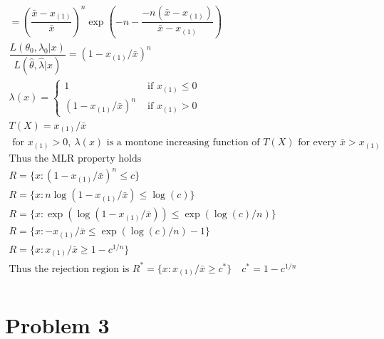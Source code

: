 \documentclass{article}
\newcommand{\lm}{\lambda}
\newcommand{\hth}{\hat{\theta}}
\newcommand{\ta}{\theta}
\newcommand{\lx}{\lambda(x)}
\newcommand{\xm}{x_{(1)}}
\begin{document}
\begin{flushleft}
\begin{multline*}
=\left(\dfrac{\bar{x}-\xm}{\bar{x}}\right)^n\exp\left(-n-\dfrac{-n(\bar{x}-\xm)}{\bar{x}-\xm}\right)\\
\dfrac{L(\ta_0,\lm_0|x)}{L(\hth,\hat{\lm}|x)}=(1-\xm/\bar{x})^n\\
\lx=\begin{cases}
1 & \text{ if } \xm\leq 0\\
(1-\xm/\bar{x})^n & \text{ if } \xm> 0
\end{cases}\\
T(X)=\xm/\bar{x}\\
\text{ for } \xm > 0,  \ \lx \text{ is a montone increasing function of } T(X) \text{ for every } \bar{x}>\xm\\
\text{Thus the MLR property holds}\\
R=\{x:(1-\xm/\bar{x})^n\leq c \}\\
R=\{x:n\log(1-\xm/\bar{x})\leq \log(c) \}\\
R=\{x:\exp(\log(1-\xm/\bar{x}))\leq \exp(\log(c)/n) \}\\
R=\{x:-\xm/\bar{x}\leq \exp(\log(c)/n)-1 \}\\
R=\{x:\xm/\bar{x}\geq 1-c^{1/n}\}\\
\text{Thus the rejection region is }
R^*=\{x: \xm/\bar{x}\geq c^* \} \quad c^*=1-c^{1/n}\\
\end{multline*}

\section*{Problem 3}
	

\end{flushleft}
\end{document}
